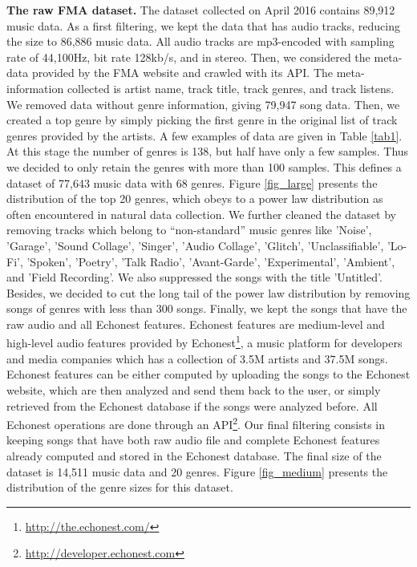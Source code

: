 \documentclass{article}
\begin{document}
\noindent
{\bf The raw FMA dataset.} The dataset collected on April 2016 contains 89,912 music data. As a first filtering, we kept the data that has audio tracks, reducing the size to 86,886 music data. All audio tracks are mp3-encoded with sampling rate of 44,100Hz, bit rate 128kb/s, and in stereo. Then, we considered the meta-data provided by the FMA website and crawled with its API. The meta-information collected is artist name, track title, track genres, and track listens. We removed data without genre information, giving 79,947 song data. Then, we created a top genre by simply picking the first genre in the original list of track genres provided by the artists. A few examples of data are given in Table \ref{tab1}. At this stage the number of genres is 138, but half have only a few samples. Thus we decided to only retain the genres with more than 100 samples. This defines a dataset of 77,643 music data with 68 genres. Figure \ref{fig_large} presents the distribution of the top 20 genres, which obeys to a power law distribution as often encountered in natural data collection. We further cleaned the dataset by removing tracks which belong to ``non-standard'' music genres like 'Noise', 'Garage', 'Sound Collage', 'Singer', 'Audio Collage', 'Glitch', 'Unclassifiable', 'Lo-Fi', 'Spoken', 'Poetry', 'Talk Radio', 'Avant-Garde', 'Experimental', 'Ambient', and 'Field Recording'. We also suppressed the songs with the title 'Untitled'. Besides, we decided to cut the long tail of the power law distribution by removing songs of genres with less than 300 songs. Finally, we kept the songs that have the raw audio and all Echonest features. Echonest features are medium-level and high-level audio features provided by Echonest\footnote{\url{http://the.echonest.com/}}, a music platform for developers and media companies which has a collection of 3.5M artists and 37.5M songs. Echonest features can be either computed by uploading the songs to the Echonest website, which are then analyzed and send them back to the user, or simply retrieved from the Echonest database if the songs were analyzed before. All Echonest operations are done through an API\footnote{\url{http://developer.echonest.com}}. Our final filtering consists in keeping songs that have both raw audio file and complete Echonest features already computed and stored in the Echonest database. The final size of the dataset is 14,511 music data and 20 genres. Figure \ref{fig_medium} presents the distribution of the genre sizes for this dataset. \\
\end{document}

